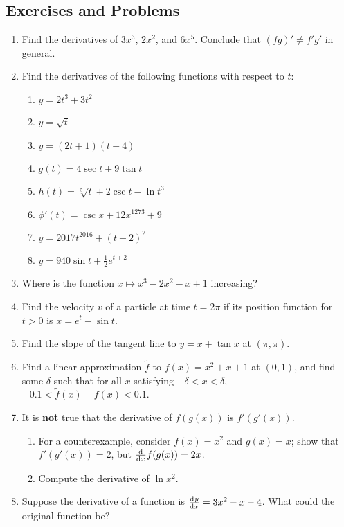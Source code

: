 \subsection{Exercises and Problems}
\begin{enumerate}
  \item Find the derivatives of $ 3x^3 $, $ 2x^2 $, and $ 6x^5 $. Conclude that $ (fg)' \neq f' g' $ in general.
  \item Find the derivatives of the following functions with respect to $ t $:
    \begin{enumerate}
      \item $ y = 2t^3 + 3t^2 $
      \item $ y = \sqrt{t} $
      \item $ y = (2t + 1)(t - 4) $
      \item $ g(t) = 4 \sec t + 9 \tan t $
      \item $ h(t) = \sqrt[5]{t} + 2\csc t - \ln t^3 $
      \item $ \phi'(t) = \csc x + 12x^{1273} + 9 $
      \item $ y = 2017t^{2016} + (t + 2)^2 $
      \item $ y = 940\sin t + \frac{1}{2}e^{t + 2} $
    \end{enumerate}
  \item Where is the function $ x \mapsto x^3 - 2x^2 - x + 1 $ increasing?
  \item Find the velocity $ v $ of a particle at time $ t = 2\pi $ if its position function for $ t > 0 $ is $ x = e^t - \sin t $.
  \item Find the slope of the tangent line to $ y = x + \tan x $ at $ (\pi, \pi) $.
  \item Find a linear approximation $ \tilde f $ to $ f(x) = x^2 + x + 1 $ at $ (0,1) $, and find some $ \delta $ such
        that for all $ x $ satisfying $ -\delta < x < \delta $, $ -0.1 < \tilde f(x) - f(x) < 0.1 $.
  \item It is \textbf{not} true that the derivative of $ f(g(x)) $ is $ f'(g'(x)) $.
    \begin{enumerate}
      \item For a counterexample, consider $ f(x) = x^2 $ and $ g(x) = x $; show that $ f'(g'(x)) = 2 $, but $ \od{}{x} f(g(x)) = 2x $.
      \item Compute the derivative of $ \ln x^2 $.
    \end{enumerate}
  \item Suppose the derivative of a function is $ \od{y}{x} = 3x^2 - x - 4 $. What could the original function be?

\end{enumerate}
